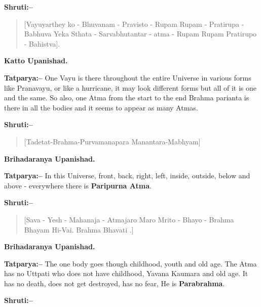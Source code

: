 \textbf{Shruti:–}

\begin{verse}
[Vayuyarthey ko - Bhuvanam - Pravisto - Rupam Rupam - Pratirupa - Babhuva  Yeka Sthata - Sarvabhutantar - atma - Rupam Rupam Pratirupo - Bahistva].
\end{verse}

\begin{flushright}
\textbf{Katto Upanishad.}
\end{flushright}

\textbf{Tatparya:–} One Vayu is there throughout the entire Universe in various forms like Pranavayu, or like a hurricane, it may look different forms but all of it is one and the same. So also, one Atma from the start to the end Brahma parianta is there in all the bodies and it seems to appear as many Atmas.

\newpage

\textbf{Shruti:–}

\begin{verse}
[Tadetat-Brahma-Purvamanapara Manantara-Mabhyam]
\end{verse}

\begin{flushright}
\textbf{Brihadaranya Upanishad.}
\end{flushright}

\vskip 2pt

\textbf{Tatparya:–} In this Universe, front, back, right, left, inside, outside, below and above - everywhere there is \textbf{Paripurna Atma}.

\vskip 4pt

\textbf{Shruti:–}

\begin{verse}
[Sava - Yesh - Mahanaja - Atmajaro Maro Mrito - Bhayo - Brahma Bhayam Hi-Vai. Brahma Bhavati .]
\end{verse}

\begin{flushright}
\textbf{Brihadaranya Upanishad.}
\end{flushright}

\vskip 2pt

\textbf{Tatparya:–} The one body goes though childhood, youth and old age. The Atma has no Uttpati who does not have childhood, Yavana Kaumara and old age. It has no death, does not get destroyed, has no fear, He is \textbf{Parabrahma}.

\vskip 4pt

\textbf{Shruti:–}

